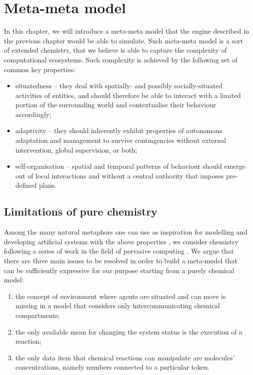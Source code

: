 \documentclass[12pt,a4paper,twoside,openright]{book}
\begin{document}
\chapter{Meta-meta model}
\label{meta-meta-model}
In this chapter, we will introduce a meta-meta model that the engine described in the previous chapter would be able to simulate.
%
Such meta-meta model is a sort of extended chemistry, that we believe is able to capture the complexity of computational ecosystems.
% 
Such complexity is achieved by the following set of common key properties:
\begin{itemize}
 \item situatedness -- they deal with spatially- and possibly socially-situated activities of entities, and should therefore be able to interact with a limited portion of the surrounding world and contextualise their behaviour accordingly; 
 \item adaptivity -- they should inherently exhibit properties of autonomous adaptation and management to survive contingencies without external intervention, global supervision, or both; 
 \item self-organisation -- spatial and temporal patterns of behaviour should emerge out of local interactions and without a central authority that imposes pre-defined plans.
\end{itemize}

\section{Limitations of pure chemistry}

Among the many natural metaphors one can use as inspiration for modelling and developing artificial systems with the above properties \cite{ecosystems-jpcc7}, we consider chemistry following a series of work in the field of pervasive computing \cite{VCMZ-TAAS2011,VZ-INS2010,sapere-procedia7}. 
%
We argue that there are three main issues to be resolved in order to build a meta-model that can be sufficiently expressive for our purpose starting from a purely chemical model:
\begin{enumerate}
 \item the concept of environment where agents are situated and can move is missing in a model that considers only intercommunicating chemical compartments;
 \item the only available mean for changing the system status is the execution of a reaction;
 \item the only data item that chemical reactions can manipulate are molecules' concentrations, namely numbers connected to a particular token.
\end{enumerate}
\end{document}
